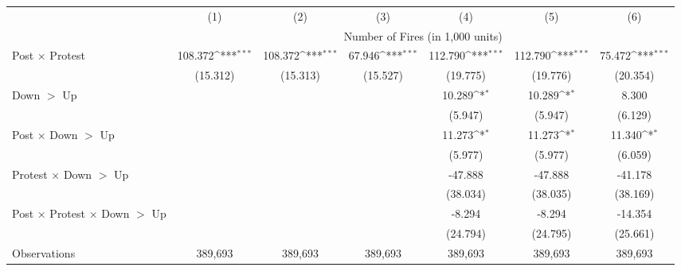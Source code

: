 {
\def\sym#1{\ifmmode^{#1}\else\(^{#1}\)\fi}
\begin{tabular}{l*{6}{c}}
\hline
            &\multicolumn{1}{c}{(1)}         &\multicolumn{1}{c}{(2)}         &\multicolumn{1}{c}{(3)}         &\multicolumn{1}{c}{(4)}         &\multicolumn{1}{c}{(5)}         &\multicolumn{1}{c}{(6)}         \\
            & \multicolumn{6}{c}{Number of Fires (in 1,000 units)} \\ \hline

Post $\times$ Protest&     108.372\sym{***}&     108.372\sym{***}&      67.946\sym{***}&     112.790\sym{***}&     112.790\sym{***}&      75.472\sym{***}\\
            &    (15.312)         &    (15.313)         &    (15.527)         &    (19.775)         &    (19.776)         &    (20.354)         \\
Down $>$ Up &                     &                     &                     &      10.289\sym{*}  &      10.289\sym{*}  &       8.300         \\
            &                     &                     &                     &     (5.947)         &     (5.947)         &     (6.129)         \\
Post $\times$ Down $>$ Up&                     &                     &                     &      11.273\sym{*}  &      11.273\sym{*}  &      11.340\sym{*}  \\
            &                     &                     &                     &     (5.977)         &     (5.977)         &     (6.059)         \\
Protest $\times$ Down $>$ Up&                     &                     &                     &     -47.888         &     -47.888         &     -41.178         \\
            &                     &                     &                     &    (38.034)         &    (38.035)         &    (38.169)         \\
Post $\times$ Protest $\times$ Down $>$ Up&                     &                     &                     &      -8.294         &      -8.294         &     -14.354         \\
            &                     &                     &                     &    (24.794)         &    (24.795)         &    (25.661)         \\
\hline
Observations&     389,693         &     389,693         &     389,693         &     389,693         &     389,693         &     389,693         \\

\end{tabular}}
